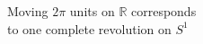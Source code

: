 \documentclass[preview]{standalone}
\begin{document}
\begin{center}
Moving $2\pi$ units on $\mathbb{R}$ corresponds\\to one complete revolution on $S^1$
\end{center}
\end{document}
